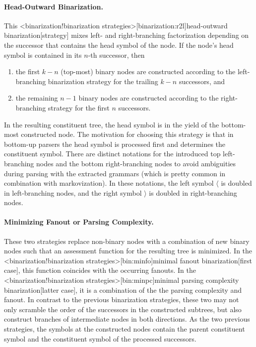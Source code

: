 \documentclass[../../document.tex]{subfiles}
\begin{document}
    \paragraph{Head-Outward Binarization.}
    This <binarization!binarization strategies>[binarization:r2l]{head-outward binarization}[strategy] mixes left- and right-branching factorization depending on the successor that contains the head symbol of the node.
    If the node's head symbol is contained in its \(n\)-th successor, then
    \begin{enumerate}
        \item the first \(k-n\) (top-most) binary nodes are constructed according to the left-branching binarization strategy for the trailing \(k-n\) successors, and
        \item the remaining \(n-1\) binary nodes are constructed according to the right-branching strategy for the first \(n\) successors.
    \end{enumerate}
    In the resulting constituent tree, the head symbol is in the yield of the bottom-most constructed node.
    The motivation for choosing this strategy is that in bottom-up parsers the head symbol is processed first and determines the constituent symbol.
    There are distinct notations for the introduced top left-branching nodes and the bottom right-branching nodes to avoid ambiguities during parsing with the extracted grammars (which is pretty common in combination with markovization).
    In these notations, the left symbol \(\langle\) is doubled in left-branching nodes, and the right symbol \(\rangle\) is doubled in right-branching nodes.

    \paragraph{Minimizing Fanout or Parsing Complexity.}
    These two strategies replace non-binary nodes with a combination of new binary nodes such that an assessment function for the resulting tree is minimized.
    In the <binarization!binarization strategies>[bin:minfo]{minimal fanout binarization}[first case], this function coincides with the occurring fanouts.
    In the <binarization!binarization strategies>[bin:minpc]{minimal parsing complexity binarization}[latter case], it is a combination of the the parsing complexity and fanout.
    In contrast to the previous binarization strategies, these two may not only scramble the order of the successors in the constructed subtrees, but also construct branches of intermediate nodes in both directions.
    As the two previous strategies, the symbols at the constructed nodes contain the parent constituent symbol and the constituent symbol of the processed successors.
\end{document}
